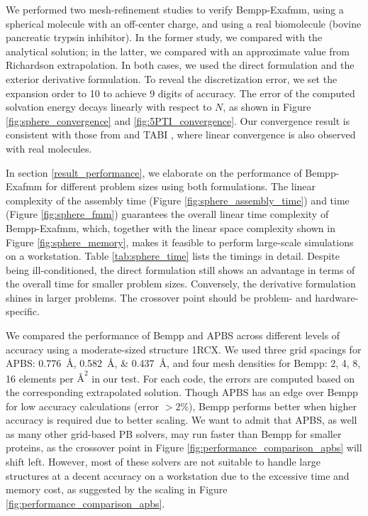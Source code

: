 We performed two mesh-refinement studies to verify Bempp-Exafmm, using a spherical molecule with an off-center charge, and using a real biomolecule (bovine pancreatic trypsin inhibitor).
In the former study, we compared with the analytical solution; in the latter, we compared with an approximate value from Richardson extrapolation.
In both cases, we used the direct formulation and the exterior derivative formulation.
To reveal the discretization error, we set the \fmm expansion order to 10 to achieve 9 digits of accuracy.
The error of the computed solvation energy decays linearly with respect to $N$, as shown in Figure \ref{fig:sphere_convergence} and \ref{fig:5PTI_convergence}.
Our convergence result is consistent with those from \pygbe \cite{CooperBardhanBarba2014} and TABI \cite{GengKrasny2013}, where linear convergence is also observed with real molecules.

In section \ref{result_performance}, we elaborate on the performance of Bempp-Exafmm for different problem sizes using both formulations.
The linear complexity of the assembly time (Figure \ref{fig:sphere_assembly_time}) and \fmm time (Figure \ref{fig:sphere_fmm}) guarantees the overall linear time complexity of Bempp-Exafmm, which, together with the linear space complexity shown in Figure \ref{fig:sphere_memory}, makes it feasible to perform large-scale simulations on a workstation.
Table \ref{tab:sphere_time} lists the timings in detail.
Despite being ill-conditioned, the direct formulation still shows an advantage in terms of the overall time for smaller problem sizes.
Conversely, the derivative formulation shines in larger problems.
The crossover point should be problem- and hardware-specific.

We compared the performance of Bempp and APBS across different levels of accuracy using a moderate-sized structure 1RCX.
We used three grid spacings for APBS: \SIlist{0.776;0.582;0.437}{\angstrom}, and four mesh densities for Bempp: 2, 4, 8, 16 elements per $\si{\angstrom}^{2}$ in our test.
For each code, the errors are computed based on the corresponding extrapolated solution.
Though APBS has an edge over Bempp for low accuracy calculations (error $>2\%$), Bempp performs better when higher accuracy is required due to better scaling.
We want to admit that APBS, as well as many other grid-based PB solvers, may run faster than Bempp for smaller proteins, as the crossover point in Figure \ref{fig:performance_comparison_apbs} will shift left.
However, most of these solvers are not suitable to handle large structures at a decent accuracy on a workstation due to the excessive time and memory cost, as suggested by the scaling in Figure \ref{fig:performance_comparison_apbs}.

